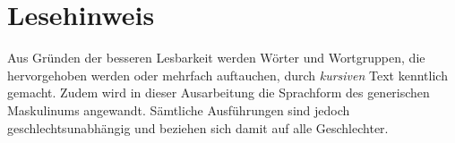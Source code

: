 \documentclass[a4paper,12pt]{scrreprt}
\begin{document}
\chapter*{Lesehinweis}
Aus Gründen der besseren Lesbarkeit werden Wörter und Wortgruppen, die hervorgehoben werden oder mehrfach auftauchen, durch \emph{kursiven} Text kenntlich gemacht. Zudem wird in dieser Ausarbeitung die Sprachform des generischen Maskulinums angewandt. Sämtliche Ausführungen sind jedoch geschlechtsunabhängig und beziehen sich damit auf alle Geschlechter.
\newpage
\tableofcontents
\listoffigures
\listoftables
\lstlistoflistings
\newpage

\setcounter{page}{1}
\pagestyle{fancy}
\setcounter{chapter}{0}
\newpage











%





\appendix




%
%
\raggedright
\printbibliography
\end{document}
